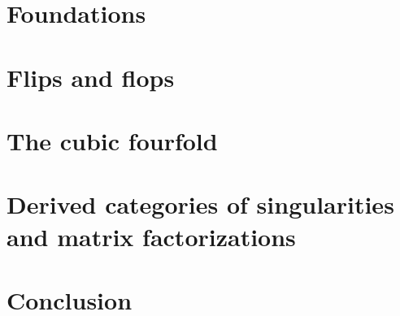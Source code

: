\section{Foundations}

\newpage

\section{Flips and flops}

\newpage

\section{The cubic fourfold}

\newpage

\section{Derived categories of singularities and matrix factorizations}

\newpage

\section{Conclusion}

